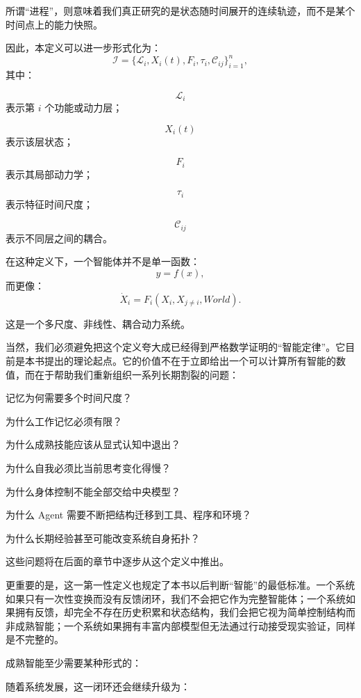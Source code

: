所谓“进程”，则意味着我们真正研究的是状态随时间展开的连续轨迹，而不是某个时间点上的能力快照。

因此，本定义可以进一步形式化为：
\[
\mathcal I
=
\{
\mathcal L_i,
X_i(t),
F_i,
\tau_i,
\mathcal C_{ij}
\}_{i=1}^{n},
\]
其中：

\[
\mathcal L_i
\]
表示第 \(i\) 个功能或动力层；

\[
X_i(t)
\]
表示该层状态；

\[
F_i
\]
表示其局部动力学；

\[
\tau_i
\]
表示特征时间尺度；

\[
\mathcal C_{ij}
\]
表示不同层之间的耦合。

在这种定义下，一个智能体并不是单一函数：
\[
y=f(x),
\]
而更像：
\[
\boxed{
\dot X_i
=
F_i(
X_i,
X_{j\neq i},
World
).
}
\]

这是一个多尺度、非线性、耦合动力系统。

当然，我们必须避免把这个定义夸大成已经得到严格数学证明的“智能定律”。它目前是本书提出的理论起点。它的价值不在于立即给出一个可以计算所有智能的数值，而在于帮助我们重新组织一系列长期割裂的问题：

记忆为何需要多个时间尺度？

为什么工作记忆必须有限？

为什么成熟技能应该从显式认知中退出？

为什么自我必须比当前思考变化得慢？

为什么身体控制不能全部交给中央模型？

为什么 Agent 需要不断把结构迁移到工具、程序和环境？

为什么长期经验甚至可能改变系统自身拓扑？

这些问题将在后面的章节中逐步从这个定义中推出。

更重要的是，这一第一性定义也规定了本书以后判断“智能”的最低标准。一个系统如果只有一次性变换而没有反馈闭环，我们不会把它作为完整智能体；一个系统如果拥有反馈，却完全不存在历史积累和状态结构，我们会把它视为简单控制结构而非成熟智能；一个系统如果拥有丰富内部模型但无法通过行动接受现实验证，同样是不完整的。

成熟智能至少需要某种形式的：
\begin{statementbox}
\centering
{}
\end{statementbox}

随着系统发展，这一闭环还会继续升级为：
\begin{statementbox}
\centering
{}
\end{statementbox}

